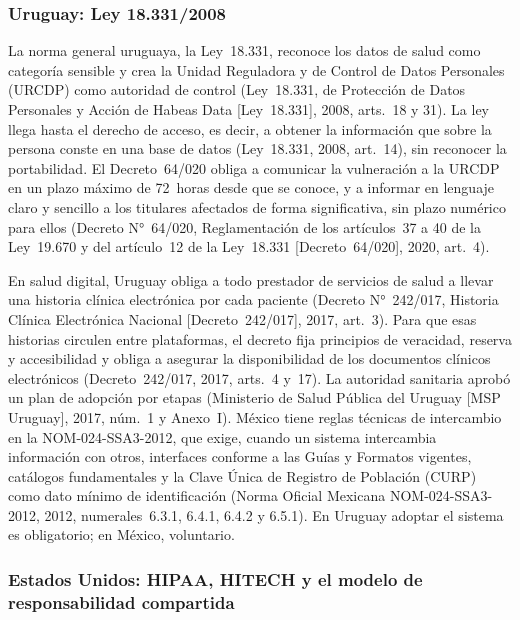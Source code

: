 \documentclass[12pt, a4paper]{article}
\begin{document}
\subsubsection{Uruguay: Ley 18.331/2008}
 
La norma general uruguaya, la Ley~18.331, reconoce los datos de salud
como categoría sensible y crea la Unidad Reguladora y de Control de
Datos Personales (URCDP) como autoridad de control (Ley~18.331, de
Protección de Datos Personales y Acción de Habeas Data [Ley~18.331],
2008, arts.~18 y 31). La ley llega hasta el derecho de acceso, es
decir, a obtener la información que sobre la persona conste en una
base de datos (Ley~18.331, 2008, art.~14), sin reconocer la
portabilidad. El Decreto~64/020 obliga a comunicar la vulneración a
la URCDP en un plazo máximo de 72~horas desde que se conoce, y a
informar en lenguaje claro y sencillo a los titulares afectados de
forma significativa, sin plazo numérico para ellos (Decreto
N°~64/020, Reglamentación de los artículos~37 a 40 de la Ley~19.670 y
del artículo~12 de la Ley~18.331 [Decreto~64/020], 2020, art.~4).
 
En salud digital, Uruguay obliga a todo prestador de servicios de
salud a llevar una historia clínica electrónica por cada paciente
(Decreto N°~242/017, Historia Clínica Electrónica Nacional
[Decreto~242/017], 2017, art.~3). Para que esas historias circulen entre
plataformas, el decreto fija principios de veracidad, reserva y
accesibilidad y obliga a asegurar la disponibilidad de los documentos
clínicos electrónicos (Decreto~242/017, 2017, arts.~4 y~17). La
autoridad sanitaria aprobó un plan de adopción por etapas (Ministerio de
Salud Pública del Uruguay [MSP Uruguay], 2017, núm.~1 y Anexo~I). México
tiene reglas técnicas de intercambio en la
NOM-024-SSA3-2012, que exige, cuando un sistema intercambia
información con otros, interfaces conforme a las Guías y Formatos
vigentes, catálogos fundamentales y la Clave Única de Registro de Población (CURP) como dato mínimo de
identificación (Norma Oficial Mexicana NOM-024-SSA3-2012, 2012, numerales~6.3.1, 6.4.1, 6.4.2 y 6.5.1). En Uruguay adoptar el sistema es obligatorio; en México, voluntario.

\subsubsection{Estados Unidos: HIPAA, HITECH y el modelo de
responsabilidad compartida}
\end{document}
